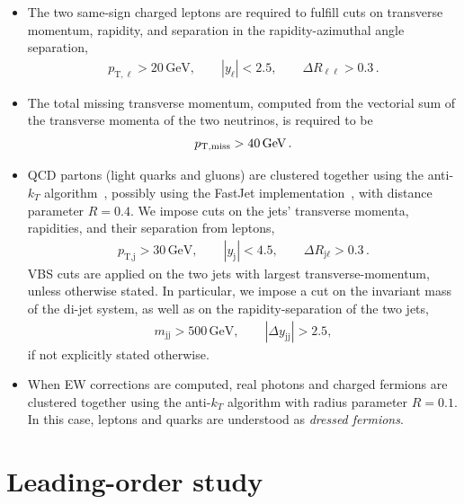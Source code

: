 \documentclass[twocolumn,epjc3]{svjour3} %
\newcommand{\Pl}{\ell}
\newcommand{\Pj}{\ensuremath{\text{j}}\xspace}
\newcommand{\GeV}{\ensuremath{\,\text{GeV}}\xspace}
\newcommand{\ptsub}[1]{\ensuremath{p_{\text{T},#1}}\xspace}
\newcommand{\etsub}[1]{\ensuremath{E_{\text{T},#1}}\xspace}
\begin{document}
    \begin{itemize}
        \item The two same-sign charged leptons are required to fulfill cuts on transverse momentum, rapidity, and separation in the rapidity-azimuthal angle separation, 
            \begin{align}
            \label{cut:1}
             \ptsub{\Pl} >  20\GeV,\qquad |y_{\Pl}| < 2.5, \qquad \Delta R_{\Pl\Pl}> 0.3\,.
            \end{align}
        \item The total missing transverse momentum, computed from the vectorial sum of the transverse momenta of the two neutrinos, is required to be
            \begin{align}
            \label{cut:2}
              p_{\rm T, miss} >  40\GeV\,.
            \end{align}
        \item QCD partons (light quarks and gluons) are clustered together using the anti-$k_T$ algorithm~\cite{Cacciari:2008gp}, possibly using the {\sc FastJet} implementation~\cite{Cacciari:2011ma}, with distance parameter $R=0.4$. %
        We impose cuts on the jets' transverse momenta, rapidities, and their separation from leptons,  
            \begin{align}
            \label{cut:3}
             \ptsub{\Pj} >  30\GeV, \qquad |y_\Pj| < 4.5, \qquad \Delta R_{\Pj\Pl} > 0.3 \,.
            \end{align}
            VBS cuts are applied on the two jets with largest transverse-momentum, unless otherwise stated. In particular, we impose a cut on the 
             in\-vari\-ant mass of the di-jet system,  as well as on the rapidity-separation of the two jets,          \begin{align}
            \label{cut:4}
             m_{\Pj \Pj} >  500\GeV,\qquad |\Delta y_{\Pj \Pj}| > 2.5, 
            \end{align}
            if not explicitly stated otherwise. 
        \item When EW corrections are computed, real photons and charged fermions are clustered together using the anti-$k_T$ algorithm with
            radius parameter $R=0.1$. In this case, leptons and quarks are understood as {\it dressed fermions}.
    \end{itemize}

\section{Leading-order study}
    \label{sec:LO}
\end{document}
